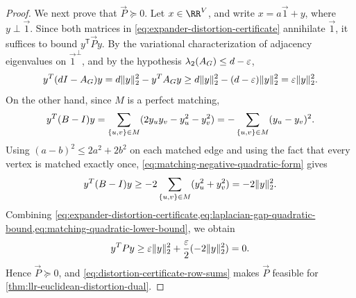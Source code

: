 \begin{proof}
	We next prove that \(\vec{P}\succeq 0\). Let \(x\in\RR^\Vertices\), and write \(x=a\vec{1}+y\), where \(y\perp\vec{1}\). Since both matrices in \cref{eq:expander-distortion-certificate} annihilate \(\vec{1}\), it suffices to bound \(y^{\mathsf{T}}\vec{P}y\). By the variational characterization of adjacency eigenvalues on \(\vec{1}^{\perp}\), and by the hypothesis \(\lambda_2(A_{G})\leq d-\varepsilon\),
	\begin{equation}
		\label{eq:laplacian-gap-quadratic-bound}
		y^{T}(dI-A_{G})y
		=d\lVert y\rVert_2^2-y^{T}A_{G}y
		\geq d\lVert y\rVert_2^2-(d-\varepsilon)\lVert y\rVert_2^2
		=\varepsilon\lVert y\rVert_2^2.
	\end{equation}
	On the other hand, since \(M\) is a perfect matching,
	\begin{equation}
		\label{eq:matching-negative-quadratic-form}
		y^{T}(B-I)y
		=
		\sum_{\{u,v\}\in M}(2y_uy_v-y_u^2-y_v^2)
		=
		-\sum_{\{u,v\}\in M}(y_u-y_v)^2.
	\end{equation}
	Using \((a-b)^2\leq 2a^2+2b^2\) on each matched edge and using the fact that every vertex is matched exactly once, \cref{eq:matching-negative-quadratic-form} gives
	\begin{equation}
		\label{eq:matching-quadratic-lower-bound}
		y^{T}(B-I)y
		\geq -2\sum_{\{u,v\}\in M}(y_u^2+y_v^2)
		=-2\lVert y\rVert_2^2.
	\end{equation}
	Combining \cref{eq:expander-distortion-certificate,eq:laplacian-gap-quadratic-bound,eq:matching-quadratic-lower-bound}, we obtain
	\begin{equation}
		\label{eq:distortion-certificate-psd}
		y^{T}Py
		\geq
		\varepsilon\lVert y\rVert_2^2+\frac{\varepsilon}{2}(-2\lVert y\rVert_2^2)
		=0.
	\end{equation}
	Hence \(\vec{P}\succeq 0\), and \cref{eq:distortion-certificate-row-sums} makes \(\vec{P}\) feasible for \cref{thm:llr-euclidean-distortion-dual}.


\end{proof}
